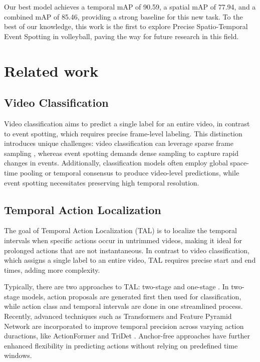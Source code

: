 \documentclass[conference]{IEEEtran}
\begin{document}
Our best model achieves a temporal mAP of 90.59, a spatial mAP of 77.94, and a combined mAP of 85.46, providing a strong baseline for this new task. To the best of our knowledge, this work is the first to explore Precise Spatio-Temporal Event Spotting in volleyball, paving the way for future research in this field.




\section{Related work}
\subsection{Video Classification}

Video classification aims to predict a single label for an entire video, in contrast to event spotting, which requires precise frame-level labeling. This distinction introduces unique challenges: video classification can leverage sparse frame sampling \cite{tsn}, whereas event spotting demands dense sampling to capture rapid changes in events. Additionally, classification models often employ global space-time pooling \cite{8578773} or temporal consensus \cite{zhou2018temporalrelationalreasoningvideos} to produce video-level predictions, while event spotting necessitates preserving high temporal resolution.


\subsection{Temporal Action Localization}

The goal of Temporal Action Localization (TAL) is to localize the temporal intervals when specific actions occur in untrimmed videos, making it ideal for prolonged actions that are not instantaneous. In contrast to video classification, which assigns a single label to an entire video, TAL requires precise start and end times, adding more complexity.

Typically, there are two approaches to TAL: two-stage \cite{9578330,10.1007/978-3-319-46487-9_47} and one-stage \cite{10203543,zhang2022actionformer}. In two-stage models, action proposals are generated first then used for classification, while action class and temporal intervals are done in one streamlined process. Recently, advanced techniques such as Transformers and Feature Pyramid Network are incorporated to improve temporal precision across varying action duractions, like ActionFormer \cite{zhang2022actionformer} and TriDet \cite{tridet}. Anchor-free approaches \cite{9171561} have further enhanced flexibility in predicting actions without relying on predefined time windows.
\end{document}
